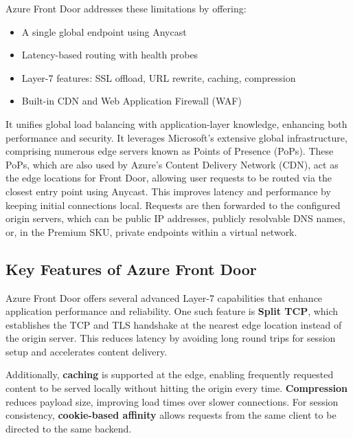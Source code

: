\documentclass[12pt]{article}
\begin{document}
Azure Front Door addresses these limitations by offering:

\begin{itemize}
\vspace{-0.8em}
  \item A single global endpoint using Anycast
  \vspace{-0.8em}
  \item Latency-based routing with health probes
  \vspace{-0.8em}
  \item Layer-7 features: SSL offload, URL rewrite, caching, compression
  \vspace{-0.8em}
  \item Built-in CDN and Web Application Firewall (WAF)
\end{itemize}

It unifies global load balancing with application-layer knowledge, enhancing both performance and security. It leverages Microsoft's extensive global infrastructure, comprising numerous edge servers known as Points of Presence (PoPs). These PoPs, which are also used by Azure's Content Delivery Network (CDN), act as the edge locations for Front Door, allowing user requests to be routed via the closest entry point using Anycast. This improves latency and performance by keeping initial connections local. Requests are then forwarded to the configured origin servers, which can be public IP addresses, publicly resolvable DNS names, or, in the Premium SKU, private endpoints within a virtual network.

\subsection{Key Features of Azure Front Door}

Azure Front Door offers several advanced Layer-7 capabilities that enhance application performance and reliability. One such feature is \textbf{Split TCP}, which establishes the TCP and TLS handshake at the nearest edge location instead of the origin server. This reduces latency by avoiding long round trips for session setup and accelerates content delivery.

Additionally, \textbf{caching} is supported at the edge, enabling frequently requested content to be served locally without hitting the origin every time. \textbf{Compression} reduces payload size, improving load times over slower connections. For session consistency, \textbf{cookie-based affinity} allows requests from the same client to be directed to the same backend.
\end{document}
